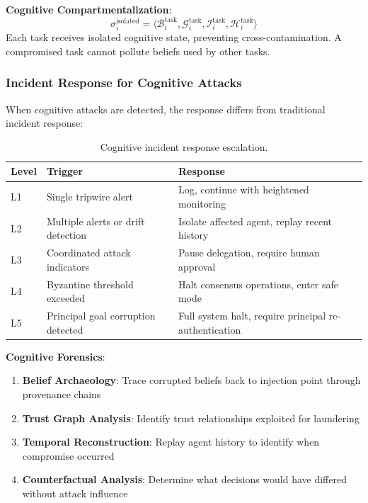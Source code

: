 \documentclass[
]{article}
\begin{document}
\textbf{Cognitive Compartmentalization}: \begin{equation}
\label{eq:compartmentalization}
\sigma_i^{\text{isolated}} = \langle \mathcal{B}_i^{\text{task}}, \mathcal{G}_i^{\text{task}}, \mathcal{I}_i^{\text{task}}, \mathcal{H}_i^{\text{task}} \rangle
\end{equation} Each task receives isolated cognitive state, preventing
cross-contamination. A compromised task cannot pollute beliefs used by
other tasks.

\subsubsection{Incident Response for Cognitive
Attacks}\label{incident-response-for-cognitive-attacks}

When cognitive attacks are detected, the response differs from
traditional incident response:

\begin{table}[htbp]
\centering
\caption{Cognitive incident response escalation.}
\label{tab:response-escalation}
\begin{tabular}{@{}llp{5cm}@{}}
\toprule
Level & Trigger & Response \\
\midrule
L1 & Single tripwire alert & Log, continue with heightened monitoring \\
L2 & Multiple alerts or drift detection & Isolate affected agent, replay recent history \\
L3 & Coordinated attack indicators & Pause delegation, require human approval \\
L4 & Byzantine threshold exceeded & Halt consensus operations, enter safe mode \\
L5 & Principal goal corruption detected & Full system halt, require principal re-authentication \\
\bottomrule
\end{tabular}
\end{table}

\textbf{Cognitive Forensics}:

\begin{enumerate}
\item \textbf{Belief Archaeology}: Trace corrupted beliefs back to injection point through provenance chains
\item \textbf{Trust Graph Analysis}: Identify trust relationships exploited for laundering
\item \textbf{Temporal Reconstruction}: Replay agent history to identify when compromise occurred
\item \textbf{Counterfactual Analysis}: Determine what decisions would have differed without attack influence
\end{enumerate}
\end{document}
